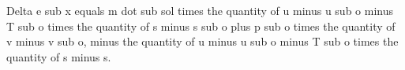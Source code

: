 Delta e sub x equals m dot sub sol times the quantity of u minus u sub o minus T sub o times the quantity of s minus s sub o plus p sub o times the quantity of v minus v sub o, minus the quantity of u minus u sub o minus T sub o times the quantity of s minus s.